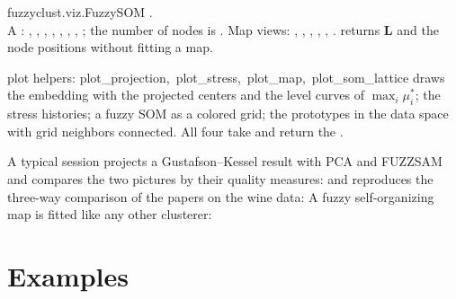 \begin{apibox}{fuzzyclust.viz.FuzzySOM}
. \\
A : , , , , , , , ; the number of nodes is . Map views: , , , , , .  returns $\mathbf{L}$ and the node positions without fitting a map.
\end{apibox}

\begin{apibox}{plot helpers: plot\_projection,\allowbreak\ plot\_stress,\allowbreak\ plot\_map,\allowbreak\ plot\_som\_lattice}
 draws the embedding with the projected centers and the level curves of $\max_i\mu^*_i$;  the stress histories;  a fuzzy SOM as a colored grid;  the prototypes in the data space with grid neighbors connected. All four take  and return the .
\end{apibox}

A typical session projects a Gustafson--Kessel result with PCA and FUZZSAM and compares the two pictures by their quality measures:
and reproduces the three-way comparison of the papers on the wine data:
A fuzzy self-organizing map is fitted like any other clusterer:

\section{Examples}\label{sec:viz:examples}

